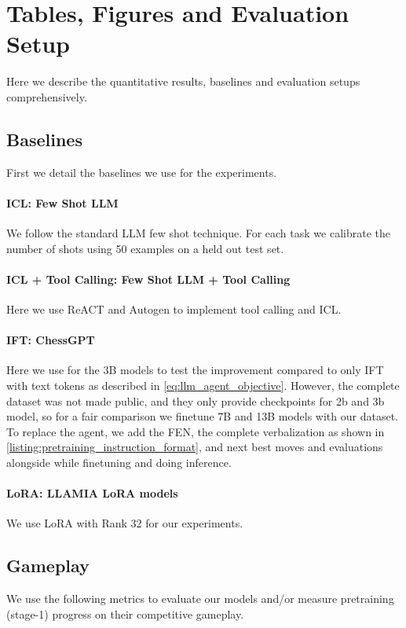 \documentclass{article}
\theoremstyle{plain}
\theoremstyle{definition}
\theoremstyle{remark}
\begin{document}
\section{Tables, Figures and Evaluation Setup}
Here we describe the quantitative results, baselines and evaluation setups comprehensively.
\subsection{Baselines} First we detail the baselines we use for the experiments.
\paragraph{ICL: Few Shot LLM} We follow the standard LLM few shot technique. For each task we calibrate the number of shots using 50 examples on a held out test set.
\paragraph{ICL + Tool Calling: Few Shot LLM + Tool Calling}
Here we use ReACT \cite{wu2023autogen} and Autogen \cite{wu2023autogen} to implement tool calling and ICL.
\paragraph{IFT: ChessGPT}
Here we use \cite{feng2024chessgpt} for the 3B models to test the improvement compared to only IFT with text tokens as described in \cref{eq:llm_agent_objective}. However, the complete dataset was not made public, and they only provide checkpoints for 2b and 3b model, so for a fair comparison we finetune 7B and 13B models with our dataset. To replace the agent, we add the FEN, the complete verbalization as shown in \cref{listing:pretraining_instruction_format}, and next best moves and evaluations alongside while finetuning and doing inference.
\paragraph{LoRA: LLAMIA LoRA models} We use LoRA with Rank 32 for our experiments.


\label{sec:addl-results}
\FloatBarrier
\subsection{Gameplay}
\label{app:gameplay_eval}
We use the following metrics to evaluate our models and/or measure pretraining (stage-1) progress on their competitive gameplay.
\end{document}
